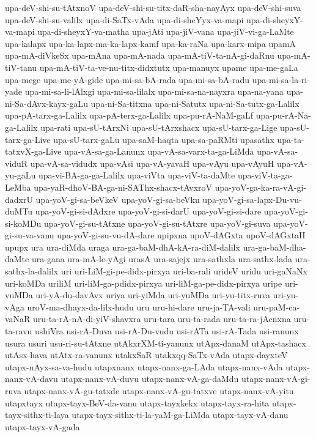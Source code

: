 {upa-deV-shi-su-tAtxnoV
upa-deV-shi-su-titx-daR-sha-nayAyx
upa-deV-shi-suva
upa-deV-shi-su-valilx
upa-di-SaTx-vAda
upa-di-sheYyx-va-mapi
upa-di-sheyxY-va-mapi
upa-di-sheyxY-va-matha
upa-jAti
upa-jiV-vana
upa-jiV-vi-ga-LaMte
upa-kalapx
upa-ka-lapx-ma-ka-lapx-kamf
upa-ka-raNa
upa-karx-mipa
upamA
upa-mA-diVkeSx
upa-mAna
upa-mA-nada
upa-mA-tiV-ta-nA-gi-daRnu
upa-mA-tiV-tanu
upa-mA-tiV-ta-ve-nu-titx-didxtutx
upa-manuyx
upame
upa-me-gaLa
upa-mege
upa-me-yA-gide
upa-mi-sa-bA-rada
upa-mi-sa-bA-radu
upa-mi-sa-la-ri-yade
upa-mi-sa-li-lAlxgi
upa-mi-sa-lilalx
upa-mi-sa-na-nayxra
upa-na-yana
upa-ni-Sa-dAvx-kayx-gaLu
upa-ni-Sa-titxna
upa-ni-Satutx
upa-ni-Sa-tutx-ga-Lalilx
upa-pA-tarx-ga-Lalilx
upa-pA-terx-ga-Lalilx
upa-pu-rA-NaM-gaLf
upa-pu-rA-Na-ga-Lalilx
upa-rati
upa-sU-tArxNi
upa-sU-tArxshacx
upa-sU-tarx-ga-Lige
upa-sU-tarx-ga-Live
upa-sU-tarx-gaLu
upa-saM-haqta
upa-sa-paRMti
upasathx
upa-ta-tatxvX-ga-Live
upa-vA-sa-ga-Lanunx
upa-vA-sa-varx-ta-ga-LiMda
upa-vA-sa-viduR
upa-vA-sa-vidudx
upa-vAsi
upa-vA-yavaH
upa-vAyu
upa-vAyuH
upa-vA-yu-gaLu
upa-vi-BA-ga-ga-Lalilx
upa-viVta
upa-viV-ta-daMte
upa-viV-ta-ga-LeMba
upa-yaR-dhoV-BA-ga-ni-SAThx-shacx-tAvxroV
upa-yoV-ga-ka-ra-vA-gi-dadxrU
upa-yoV-gi-sa-beVkeV
upa-yoV-gi-sa-beVku
upa-yoV-gi-sa-lapx-Du-vu-duMTu
upa-yoV-gi-si-dAdxre
upa-yoV-gi-si-darU
upa-yoV-gi-si-dare
upa-yoV-gi-si-koMDu
upa-yoV-gi-su-tAtxne
upa-yoV-gi-su-tAtxre
upa-yoV-gi-suva
upa-yoV-gi-su-va-vanu
upa-yoV-gi-su-vu-dA-dare
upipxna
upoV-dAGxta
upoV-dAGxtaH
upupx
ura
ura-diMda
uraga
ura-ga-baM-dhA-kA-ra-diM-dalilx
ura-ga-baM-dha-daMte
ura-gana
ura-mA-le-yAgi
urasA
ura-sajejx
ura-sathxla
ura-sathx-lada
ura-sathx-la-dalilx
uri
uri-LiM-gi-pe-didx-pirxya
uri-ba-rali
urideV
uridu
uri-gaNaNx
uri-koMDa
uriliM
uri-liM-ga-pdidx-pirxya
uri-liM-ga-pe-didx-pirxya
uripe
uri-vuMDa
uri-yA-du-davAvx
uriya
uri-yiMda
uri-yuMDa
uri-yu-titx-ruva
uri-yu-vAga
uroV-ma-dhayx-da-lilx-hudu
uru
uru-hi-dare
uru-ja-TA-vali
uru-paM-ca-vaNaR
uru-ta-rA-nA-di-yiV-shavxra
uru-tara
uru-ta-rada
uru-ta-ra-jAcnxna
uru-ta-ravu
ushiVra
usi-rA-Duva
usi-rA-Du-vudu
usi-rATa
usi-rA-Tada
usi-ranunx
usura
usuri
usu-ri-su-tAtxne
utAkxrXM-ti-yanunx
utApx-danaM
utApx-tashacx
utAsx-hava
utAtx-ra-vanunx
utakxSaR
utakxqq-SaTx-vAda
utapx-dayxteV
utapx-nAyx-sa-va-hudu
utapxnanx
utapx-nanx-ga-LAda
utapx-nanx-vAda
utapx-nanx-vA-davu
utapx-nanx-vA-duvu
utapx-nanx-vA-ga-daMdu
utapx-nanx-vA-gi-ruva
utapx-nanx-vA-gu-tatxde
utapx-nanx-vA-gu-tatxve
utapx-nanx-vA-yitu
utapxtayx
utapx-tayx-BeV-da-vanu
utapx-tayxkekx
utapx-tayx-ra-hita
utapx-tayx-sithx-ti-laya
utapx-tayx-sithx-ti-la-yaM-ga-LiMda
utapx-tayx-vA-danu
utapx-tayx-vA-gada
}
